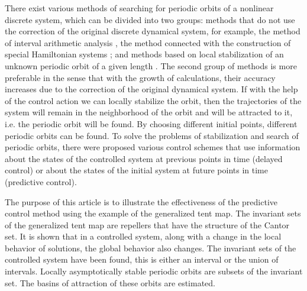 \documentclass[12pt,a4paper]{amsart}
\begin{document}
There exist various methods of searching for periodic orbits of a nonlinear discrete system, which can be divided into two groups: methods 
that do not use the correction of the original discrete dynamical system, for example, the method of interval arithmetic analysis \cite{Zyg, Gal2002, Gal2001}, 
the method connected with the construction of special Hamiltonian systems \cite{Biham}; and methods based on local stabilization of 
an unknown periodic orbit of a given length \cite{Ott, Qian, Aleks, Yang, Miller, DSLS}. The second group of methods is more preferable in the sense that with the growth 
of calculations, their accuracy increases due to the correction of the original dynamical system. If with the help of the control action we 
can locally stabilize the orbit, then the trajectories of the system will remain in the neighborhood of the orbit and will be attracted to it, 
i.e. the periodic orbit will be found. By choosing different initial points, different periodic orbits can be found. To solve the problems of 
stabilization and search of periodic orbits, there were proposed various control schemes that use information about the states of the controlled 
system at previous points in time \cite{Pyr, Vie, DK, Mor} (delayed control) or about the states of the initial system at future points in time \cite{Polyak, Ushio, Shal, DSI} 
(predictive control). 

The purpose of this article is to illustrate the effectiveness of the predictive control method using the example of the generalized tent map. 
The invariant sets of the generalized tent map are repellers that have the structure of the Cantor set. It is shown that in a controlled system, 
along with a change in the local behavior of solutions, the global behavior also changes. The invariant sets of the controlled system have been found, 
this is either an interval or the union of intervals. Locally asymptotically stable periodic orbits are subsets of the invariant set. The basins of 
attraction of these orbits are estimated. 
\end{document}
